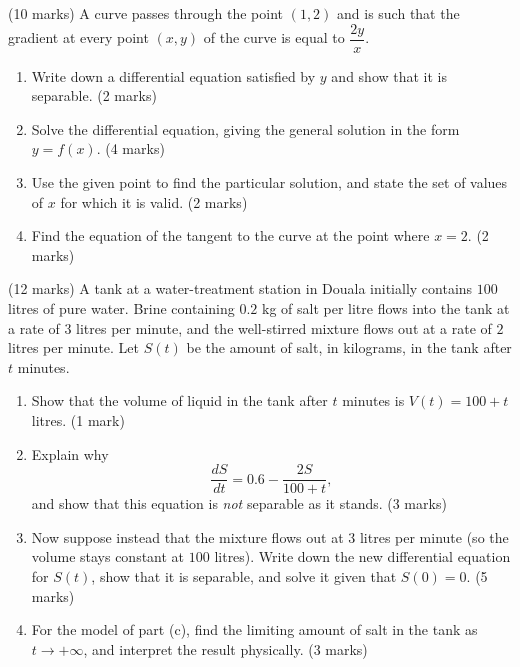 \documentclass[11pt]{article}
\begin{document}
\begin{exercice} \hfill (10 marks)
A curve passes through the point $(1,2)$ and is such that the gradient at every point $(x,y)$ of the curve is equal to $\dfrac{2y}{x}$.
\begin{enumerate}
\item[(a)] Write down a differential equation satisfied by $y$ and show that it is separable. \hfill (2 marks)
\item[(b)] Solve the differential equation, giving the general solution in the form $y=f(x)$. \hfill (4 marks)
\item[(c)] Use the given point to find the particular solution, and state the set of values of $x$ for which it is valid. \hfill (2 marks)
\item[(d)] Find the equation of the tangent to the curve at the point where $x=2$. \hfill (2 marks)
\end{enumerate}
\end{exercice}

\begin{exercice} \hfill (12 marks)
A tank at a water-treatment station in Douala initially contains $100$ litres of pure water. Brine containing $0.2$ kg of salt per litre flows into the tank at a rate of $3$ litres per minute, and the well-stirred mixture flows out at a rate of $2$ litres per minute. Let $S(t)$ be the amount of salt, in kilograms, in the tank after $t$ minutes.
\begin{enumerate}
\item[(a)] Show that the volume of liquid in the tank after $t$ minutes is $V(t)=100+t$ litres. \hfill (1 mark)
\item[(b)] Explain why
\[
\frac{dS}{dt}=0.6-\frac{2S}{100+t},
\]
and show that this equation is \emph{not} separable as it stands. \hfill (3 marks)
\item[(c)] Now suppose instead that the mixture flows out at $3$ litres per minute (so the volume stays constant at $100$ litres). Write down the new differential equation for $S(t)$, show that it is separable, and solve it given that $S(0)=0$. \hfill (5 marks)
\item[(d)] For the model of part (c), find the limiting amount of salt in the tank as $t\to+\infty$, and interpret the result physically. \hfill (3 marks)
\end{enumerate}
\end{exercice}
\end{document}
